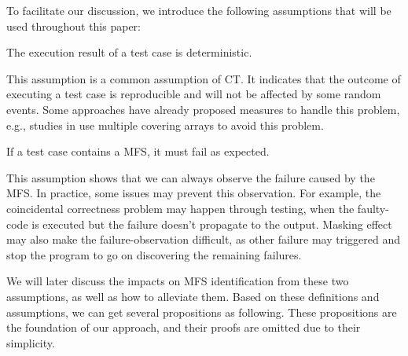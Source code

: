 \documentclass{sig-alternate-05-2015}
\begin{document}
%

To facilitate our discussion, we introduce the following assumptions that will be used throughout this paper:

\begin{assumption}  The execution result of a test case is deterministic.
\end{assumption}

This assumption is a common assumption of CT\cite{zhang2011characterizing,ghandehari2012identifying,niu2013identifying}. It indicates that the outcome of executing a test case is reproducible and will not be affected by some random events. Some approaches have already proposed measures to handle this problem, e.g., studies in \cite{yilmaz2006covering,fouche2009incremental} use multiple covering arrays to avoid this problem.

\begin{assumption} If a test case contains a MFS, it must fail as expected.
\end{assumption}

This assumption shows that we can always observe the failure caused by the MFS. In practice, some issues may prevent this observation. For example, the coincidental correctness problem \cite{Masri:2014:PCC:2582050.2559932} may happen through testing, when the faulty-code is executed but the failure doesn't propagate to the output. Masking effect \cite{yilmaz2013reducing} may also make the failure-observation difficult, as other failure may triggered and stop the program to go on discovering the remaining failures.

We will later discuss the impacts on MFS identification from these two assumptions, as well as how to alleviate them. Based on these definitions and assumptions, we can get several propositions as following. These propositions are the foundation of our approach, and their proofs are omitted due to their simplicity.
\end{document}
